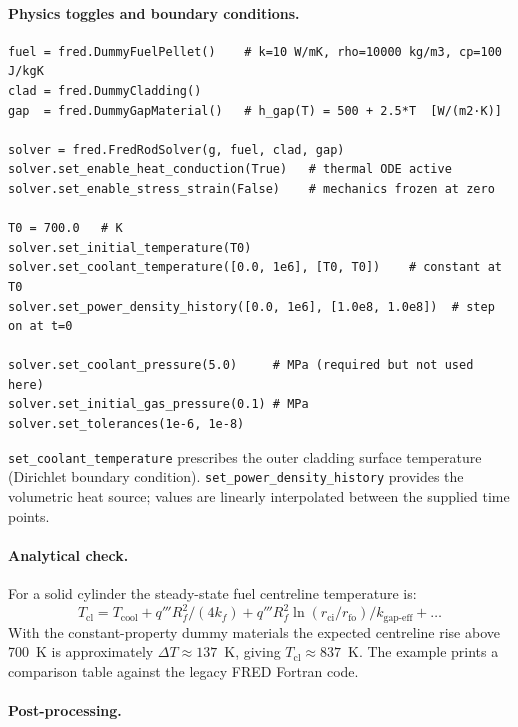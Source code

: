 \documentclass[11pt,a4paper]{article}
\begin{document}
\paragraph{Physics toggles and boundary conditions.}

\begin{lstlisting}
fuel = fred.DummyFuelPellet()    # k=10 W/mK, rho=10000 kg/m3, cp=100 J/kgK
clad = fred.DummyCladding()
gap  = fred.DummyGapMaterial()   # h_gap(T) = 500 + 2.5*T  [W/(m2·K)]

solver = fred.FredRodSolver(g, fuel, clad, gap)
solver.set_enable_heat_conduction(True)   # thermal ODE active
solver.set_enable_stress_strain(False)    # mechanics frozen at zero

T0 = 700.0   # K
solver.set_initial_temperature(T0)
solver.set_coolant_temperature([0.0, 1e6], [T0, T0])    # constant at T0
solver.set_power_density_history([0.0, 1e6], [1.0e8, 1.0e8])  # step on at t=0

solver.set_coolant_pressure(5.0)     # MPa (required but not used here)
solver.set_initial_gas_pressure(0.1) # MPa
solver.set_tolerances(1e-6, 1e-8)
\end{lstlisting}

\texttt{set\_coolant\_temperature} prescribes the outer cladding surface
temperature (Dirichlet boundary condition).  \texttt{set\_power\_density\_history}
provides the volumetric heat source; values are linearly interpolated between
the supplied time points.

\paragraph{Analytical check.}

For a solid cylinder the steady-state fuel centreline temperature is:
\begin{equation}
  T_\text{cl} = T_\text{cool} + q''' R_f^2 / (4k_f)
              + q''' R_f^2 \ln(r_\text{ci}/r_\text{fo}) / k_\text{gap-eff}
              + \ldots
\end{equation}
With the constant-property dummy materials the expected centreline rise above
700~K is approximately $\Delta T \approx 137$~K, giving $T_\text{cl} \approx 837$~K.
The example prints a comparison table against the legacy FRED Fortran code.

\paragraph{Post-processing.}
\end{document}
